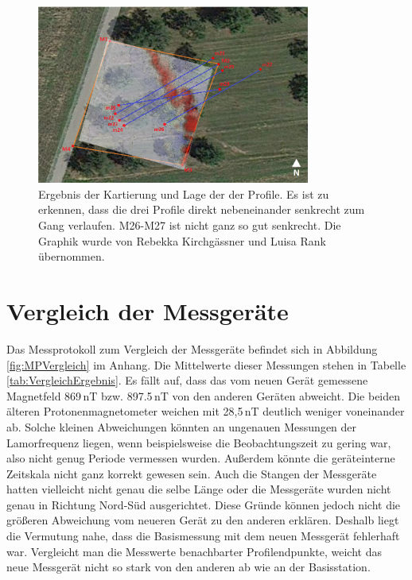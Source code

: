 \begin{figure}[!ht]
 \centering
 \includegraphics[width=0.8\textwidth]{fig/MagnetikGesamtueberblick}
 \caption[Ergebnis der Kartierung und Lage der der Profile]{Ergebnis der Kartierung und Lage der der Profile. Es ist zu erkennen, dass die drei Profile direkt nebeneinander senkrecht zum Gang verlaufen. M26-M27 ist nicht ganz so gut senkrecht. Die Graphik wurde von Rebekka Kirchgässner und Luisa Rank übernommen.}
 \label{fig:MagnetikGesamtueberblick}
\end{figure}

\section{Vergleich der Messgeräte}

Das Messprotokoll zum Vergleich der Messgeräte befindet sich in Abbildung \ref{fig:MPVergleich} im Anhang. Die Mittelwerte dieser Messungen stehen in Tabelle \ref{tab:VergleichErgebnis}. Es fällt auf, dass das vom neuen Gerät gemessene Magnetfeld 869\,nT bzw. 897.5\,nT von den anderen Geräten abweicht. Die beiden älteren Protonenmagnetometer weichen mit 28,5\,nT deutlich weniger voneinander ab. Solche kleinen Abweichungen könnten an ungenauen Messungen der Lamorfrequenz liegen, wenn beispielsweise die Beobachtungszeit zu gering war, also nicht genug Periode vermessen wurden. Außerdem könnte die geräteinterne Zeitskala nicht ganz korrekt gewesen sein. Auch die Stangen der Messgeräte hatten vielleicht nicht genau die selbe Länge oder die Messgeräte wurden nicht genau in Richtung Nord-Süd ausgerichtet. Diese Gründe können jedoch nicht die größeren Abweichung vom neueren Gerät zu den anderen erklären. Deshalb liegt die Vermutung nahe, dass die Basismessung  mit dem neuen Messgerät fehlerhaft war. Vergleicht man die Messwerte benachbarter Profilendpunkte, weicht das neue Messgerät nicht so stark von den anderen ab wie an der Basisstation.

